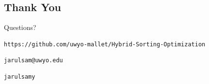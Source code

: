 \documentclass[13pt]{beamer}
\begin{document}
\subsection*{Thank You}
\begin{frame}{}
	\centering
	\Huge Questions?

	\vspace{0.3cm}

	\small

	\texttt{https://github.com/uwyo-mallet/Hybrid-Sorting-Optimization}

	\faEnvelope\texttt{jarulsam@uwyo.edu}

	\faGithub\texttt{jarulsamy}

\end{frame}
\end{document}
